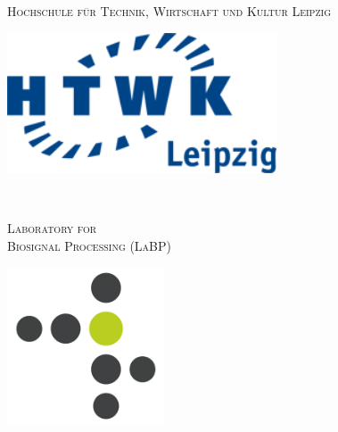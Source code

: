 \begin{titlepage}

\newcommand{\HRule}{\rule{\linewidth}{0.5mm}} %

 

\center

\begin{minipage}{0.48\textwidth}
\begin{flushleft}
\large \textsc{Hochschule für Technik, Wirtschaft und Kultur Leipzig}\\[1.3cm] %
\end{flushleft}
\begin{center}
\includegraphics[width=0.6\textwidth]{bilder/HTWK_Logo_RGB.png}\\
\end{center}
\end{minipage}
~
\begin{minipage}{0.48\textwidth}
\begin{flushright}
\large \textsc{Laboratory for \\ Biosignal Processing (LaBP)}\\[0.95cm] %
\end{flushright}
\begin{center}
\includegraphics[width=0.35\textwidth]{bilder/labp_logo.png}\\
\end{center}


\end{minipage}
\end{titlepage}

